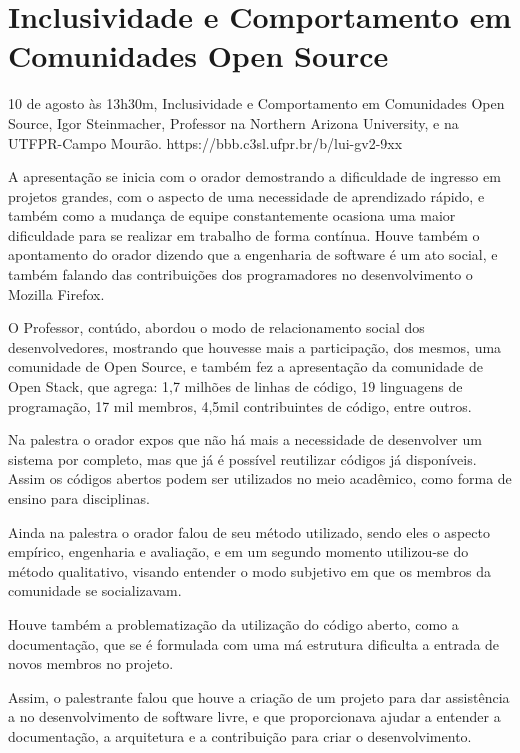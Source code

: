 \section{Inclusividade e Comportamento em Comunidades Open Source}

\begin{center}
  \vspace{1cm}
  10 de agosto às 13h30m, Inclusividade e Comportamento em Comunidades Open Source, Igor Steinmacher, Professor na Northern Arizona University, e na UTFPR-Campo Mourão. https://bbb.c3sl.ufpr.br/b/lui-gv2-9xx
  \vspace{1cm}
\end{center}

A apresentação se inicia com o orador demostrando a dificuldade de ingresso em projetos grandes, com o aspecto de uma necessidade de aprendizado rápido, e também como a mudança de equipe constantemente ocasiona uma maior dificuldade para se realizar em trabalho de forma contínua. Houve também o apontamento do orador dizendo que a engenharia de software é um ato social, e também falando das contribuições dos programadores no desenvolvimento o Mozilla Firefox.

O Professor, contúdo, abordou o modo de relacionamento social dos desenvolvedores, mostrando que houvesse mais a participação, dos mesmos, uma comunidade de Open Source, e também fez a apresentação da comunidade de Open Stack, que agrega: 1,7 milhões de linhas de código, 19 linguagens de programação, 17 mil membros, 4,5mil contribuintes de código, entre outros.

Na palestra o orador expos que não há mais a necessidade de desenvolver um sistema por completo, mas que já é possível reutilizar códigos já disponíveis. Assim os códigos abertos podem ser utilizados no meio acadêmico, como forma de ensino para disciplinas.

Ainda na palestra o orador falou de seu método utilizado, sendo eles o aspecto empírico, engenharia e avaliação, e em um segundo momento utilizou-se do método qualitativo, visando entender o modo subjetivo em que os membros da comunidade se socializavam.

Houve também a problematização da utilização do código aberto, como a documentação, que se é formulada com uma má estrutura dificulta a entrada de novos membros no projeto.

Assim, o palestrante falou que houve a criação de um projeto para dar assistência a no desenvolvimento de software livre, e que proporcionava ajudar a entender a documentação, a arquitetura e a contribuição para criar o desenvolvimento.